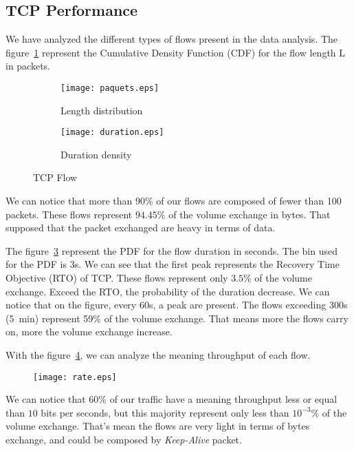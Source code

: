\documentclass[10pt, conference, a4paper, twocolumns]{IEEEtran}
\def\yassine#1{\textbf{\textcolor{blue}{yassine : #1}}}
\begin{document}
\subsection{TCP Performance}
\label{subsec:tcp}
We have analyzed the different types of flows present in the data analysis.
The figure~\ref{curve:flow_length} represent the Cumulative Density Function (CDF) for the flow length L in packets. 
 \begin{figure}[ht!]
\begin{subfigure}[h]{\columnwidth}
\centering
\texttt{[image: paquets.eps]}
\caption{Length distribution}
\label{curve:flow_length}
\end{subfigure}
\begin{subfigure}[h]{\columnwidth}
\centering
\texttt{[image: duration.eps]}
\caption{Duration density}
\label{curve:flow_duration}
\end{subfigure}
\caption{TCP Flow}
\end{figure}
We can notice that more than 90\% of our flows are composed of fewer than 100 packets. These flows represent $94.45$\% of the volume exchange in bytes. That supposed that the packet exchanged are heavy in terms of data.

The figure~\ref{curve:flow_duration} represent the PDF %
for the flow duration in seconds. The bin used for the PDF is 3s. We can see that the first peak represents the Recovery Time Objective (RTO) of TCP. These flows represent only $3.5$\% of the volume exchange. Exceed the RTO, the probability of the duration decrease. We can notice that on the figure, every 60s, a peak are present. The flows exceeding 300s (5~min) represent 59\% of the volume exchange. That means more the flows carry on, more the volume exchange increase.

With the figure~\ref{curve:flow_rate}, we can analyze the meaning throughput of each flow.
\begin{figure}[ht]
\centering
\texttt{[image: rate.eps]}
\caption{}
\label{curve:flow_rate}
\end{figure}
We can notice that 60\% of our traffic have a meaning throughput less or equal than $10$ bits per seconds, but this majority represent only less than $10^{-3}\%$ of the volume exchange. That's mean the flows are very light in terms of bytes exchange, and could be composed by \emph{Keep-Alive} packet. 
\end{document}
